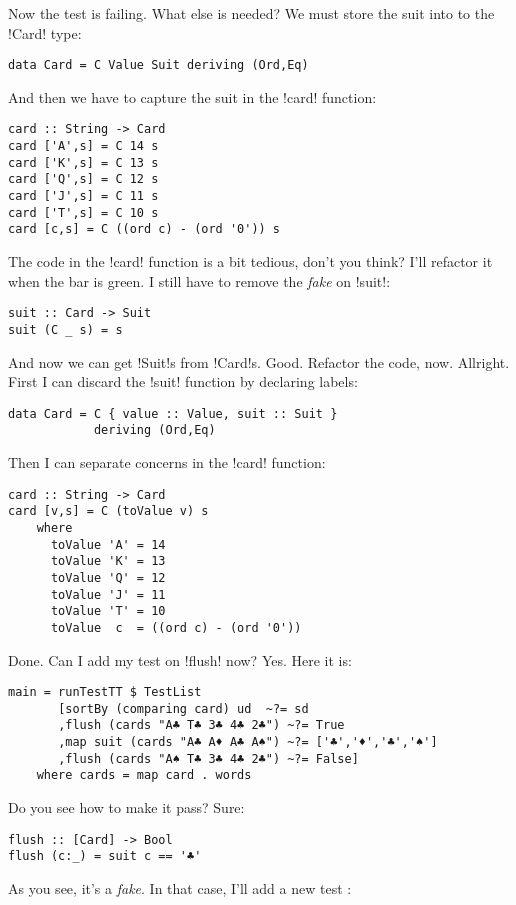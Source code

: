 \failure Now the test is failing.
\lhN What else is needed?
\lhA \failure We must store the suit into to the \il!Card! type:
\begin{lstlisting}[frame=single]
data Card = C Value Suit deriving (Ord,Eq)
\end{lstlisting}
And then we have to capture the suit in the \il!card! function:
\begin{lstlisting}[frame=single]
card :: String -> Card
card ['A',s] = C 14 s
card ['K',s] = C 13 s
card ['Q',s] = C 12 s
card ['J',s] = C 11 s
card ['T',s] = C 10 s
card [c,s] = C ((ord c) - (ord '0')) s
\end{lstlisting}
\lhN \failure The code in the \il!card! function is a bit tedious, don't you think?
\lhA \failure I'll refactor it when the bar is green. I still have to remove the \emph{fake} on \il!suit!:
\begin{lstlisting}[frame=single]
suit :: Card -> Suit
suit (C _ s) = s
\end{lstlisting}
\success And now we can get \il!Suit!s from \il!Card!s.
\lhN Good. Refactor the code, now.
\lhA \success Allright. First I can discard the \il!suit! function by declaring labels:
\begin{lstlisting}[frame=single]
data Card = C { value :: Value, suit :: Suit } 
            deriving (Ord,Eq)
\end{lstlisting}
Then I can separate concerns in the \il!card! function:
\begin{lstlisting}[frame=single]
card :: String -> Card
card [v,s] = C (toValue v) s
    where 
      toValue 'A' = 14
      toValue 'K' = 13
      toValue 'Q' = 12
      toValue 'J' = 11
      toValue 'T' = 10
      toValue  c  = ((ord c) - (ord '0'))
\end{lstlisting}
\success Done.
\lhN Can I add my test on \il!flush! now?
\lhA Yes.
\newpage
\lhN Here it is:
\begin{lstlisting}[frame=single]
main = runTestTT $ TestList 
       [sortBy (comparing card) ud  ~?= sd
       ,flush (cards "A♣ T♣ 3♣ 4♣ 2♣") ~?= True
       ,map suit (cards "A♣ A♦ A♣ A♠") ~?= ['♣','♦','♣','♠']
       ,flush (cards "A♠ T♣ 3♣ 4♣ 2♣") ~?= False]
    where cards = map card . words
\end{lstlisting} %
Do you see how to make it pass?
\lhA \failure Sure: 
\begin{lstlisting}[frame=single]
flush :: [Card] -> Bool
flush (c:_) = suit c == '♣'
\end{lstlisting}
\success As you see, it's a \emph{fake}.
\lhN In that case, I'll add a new test :
